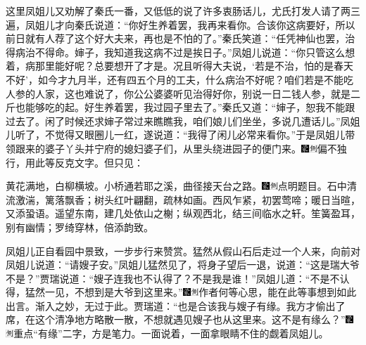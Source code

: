 这里凤姐儿又劝解了秦氏一番，又低低的说了许多衷肠话儿，尤氏打发人请了两三遍，凤姐儿才向秦氏说道：``你好生养着罢，我再来看你。合该你这病要好，所以前日就有人荐了这个好大夫来，再也是不怕的了。''秦氏笑道：``任凭神仙也罢，治得病治不得命。婶子，我知道我这病不过是挨日子。''凤姐儿说道：``你只管这么想着，病那里能好呢？总要想开了才是。况且听得大夫说，`若是不治，怕的是春天不好'，如今才九月半，还有四五个月的工夫，什么病治不好呢？咱们若是不能吃人参的人家，这也难说了，你公公婆婆听见治得好你，别说一日二钱人参，就是二斤也能够吃的起。好生养着罢，我过园子里去了。''秦氏又道：``婶子，恕我不能跟过去了。闲了时候还求婶子常过来瞧瞧我，咱们娘儿们坐坐，多说几遭话儿。''凤姐儿听了，不觉得又眼圈儿一红，遂说道：``我得了闲儿必常来看你。''于是凤姐儿带领跟来的婆子丫头并宁府的媳妇婆子们，从里头绕进园子的便门来。{\includegraphics[width=3mm]{../Images/00006}\includegraphics[width=3mm]{../Images/00011}\footnotesize \kaishu 偏不独行，用此等反克文字。}但只见：

黄花满地，白柳横坡。小桥通若耶之溪，曲径接天台之路。{\includegraphics[width=3mm]{../Images/00006}\includegraphics[width=3mm]{../Images/00011}\footnotesize \kaishu 点明题目。}石中清流激湍，篱落飘香；树头红叶翩翻，疏林如画。西风乍紧，初罢莺啼；暖日当暄，又添蛩语。遥望东南，建几处依山之榭；纵观西北，结三间临水之轩。笙簧盈耳，别有幽情；罗绮穿林，倍添韵致。

凤姐儿正自看园中景致，一步步行来赞赏。猛然从假山石后走过一个人来，向前对凤姐儿说道：``请嫂子安。''凤姐儿猛然见了，将身子望后一退，说道：``这是瑞大爷不是？''贾瑞说道：``嫂子连我也不认得了？不是我是谁！''凤姐儿道：``不是不认得，猛然一见，不想到是大爷到这里来。''{\includegraphics[width=3mm]{../Images/00006}\includegraphics[width=3mm]{../Images/00011}\footnotesize \kaishu 作者何等心思，能在此等事想到如此出言。渐入之妙，无过于此。}贾瑞道：``也是合该我与嫂子有缘。我方才偷出了席，在这个清净地方略散一散，不想就遇见嫂子也从这里来。这不是有缘么？''{\includegraphics[width=3mm]{../Images/00006}\includegraphics[width=3mm]{../Images/00011}\footnotesize \kaishu 重点``有缘''二字，方是笔力。}一面说着，一面拿眼睛不住的觑着凤姐儿。

